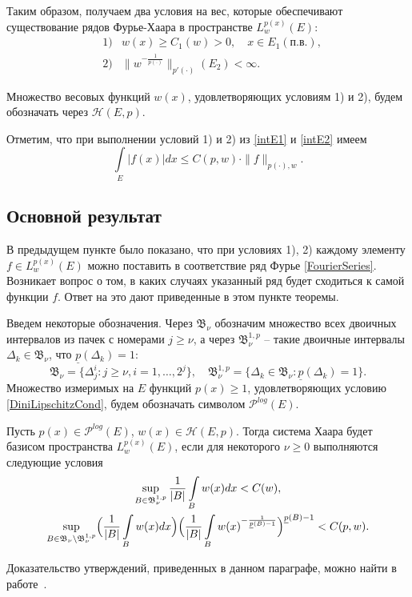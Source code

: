 Таким образом, получаем два условия на вес, которые обеспечивают существование рядов Фурье-Хаара в пространстве $L^{p(x)}_w(E)$:
\begin{eqnarray*}
&1) &w(x) \ge C_1(w) > 0, \quad x \in E_1 (\text{п.в.}),\\
&2) &\|w^{-\frac{1}{p(\cdot)}}\|_{p'(\cdot)}(E_2) < \infty.
\end{eqnarray*}

Множество весовых функций $w(x)$, удовлетворяющих условиям 1) и 2), будем обозначать через $\mathcal{H}(E,p)$.

Отметим, что при выполнении условий 1) и 2) из \eqref{intE1} и \eqref{intE2} имеем
\begin{equation}\label{fL1Finite}
  \int\limits_E |f(x)|dx \le
  C(p,w) \cdot \|f\|_{p(\cdot),w}.
\end{equation}



\subsection{Основной результат}
В предыдущем пункте было показано, что при условиях 1), 2) каждому элементу $f \in L^{p(x)}_w(E)$ можно поставить в соответствие ряд Фурье \eqref{FourierSeries}. Возникает вопрос о том, в каких случаях указанный ряд будет сходиться к самой функции $f$.
Ответ на это дают приведенные в этом пункте теоремы.

Введем некоторые обозначения.
Через $\mathfrak{B}_\nu$ обозначим множество всех двоичных интервалов из пачек с номерами $j \ge \nu$, а через $\mathfrak{B}_\nu^{1,p}$ -- такие двоичные интервалы $\Delta_k \in \mathfrak{B}_\nu$, что $\underline{p}(\Delta_k)=1$:
\begin{equation*}
    \mathfrak{B}_\nu = \{\Delta_j^i: j \ge \nu, i=1,\ldots,2^j\}, \quad
    \mathfrak{B}_\nu^{1,p} = \{\Delta_k \in \mathfrak{B}_\nu: \underline{p}(\Delta_k)=1\}.
\end{equation*}
Множество измеримых на $E$ функций $p(x) \ge 1$, удовлетворяющих условию \eqref{DiniLipschitzCond}, будем обозначать символом $\mathcal{P}^{log}(E)$.

\begin{theorem}
Пусть $p(x) \in \mathcal{P}^{log}(E)$, $w(x) \in \mathcal{H}(E,p)$. Тогда система Хаара будет базисом пространства $L^{p(x)}_w(E)$, если для некоторого $\nu \ge 0$ выполняются следующие условия
\begin{gather}
\label{wxOnB1}
\sup\limits_{B \in \mathfrak{B}_\nu^{1,p}} \frac{1}{|B|}\int\limits_B w(x)dx < C(w),\\
\label{wxOnB}
\sup\limits_{B \in \mathfrak{B}_\nu \setminus \mathfrak{B}_\nu^{1,p}}
\Bigl(\frac{1}{|B|}\int\limits_B w(x)dx\Bigr) \Bigl(\frac{1}{|B|}\int\limits_B w(x)^{-\frac{1}{\underline{p}(B)-1}} \Bigr)^{\underline{p}(B)-1} < C(p,w).
\end{gather}
\end{theorem}

Доказательство утверждений, приведенных в данном параграфе, можно найти в работе~\cite{mmg-haar-basis}.
